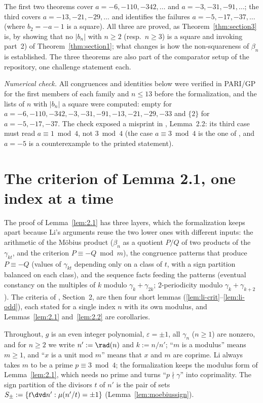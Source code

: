The first two theorems cover $a = -6, -110, -342, \dots$ and $a = -3, -31, -91, \dots$; the third
covers $a = -13, -21, -29, \dots$ and identifies the failures $a = -5, -17, -37, \dots$ (where
$b_2 = -a - 1$ is a square). All three are proved, as Theorem~\ref{thm:section3} is, by showing
that no $|b_n|$ with $n \ge 2$ (resp.\ $n \ge 3$) is a square and invoking part~2) of
Theorem~\ref{thm:section1}; what changes is how the non-squareness of $\beta_n$ is established.
The three theorems are also part of the comparator setup of the repository, one challenge
statement each.

\emph{Numerical check.} All congruences and identities below were verified in PARI/GP for the
first members of each family and $n \le 13$ before the formalization, and the lists of $n$ with
$|b_n|$ a square were computed: empty for $a = -6, -110, -342, -3, -31, -91, -13, -21, -29, -33$
and $\{2\}$ for $a = -5, -17, -37$. The check exposed a misprint in \cite{li2021}, Lemma~2.2: its
third case must read $a \equiv 1 \bmod 4$, not $3 \bmod 4$ (the case $a \equiv 3 \bmod 4$ is the
one of \cite{li2020}, and $a = -5$ is a counterexample to the printed statement).

\section{The criterion of Lemma 2.1, one index at a time}

The proof of Lemma~\ref{lem:2.1} has three layers, which the formalization keeps apart because
Li's arguments reuse the two lower ones with different inputs: the arithmetic of the Möbius
product ($\beta_n$ as a quotient $P/Q$ of two products of the $\gamma_{kt}$, and the criterion
$P \equiv -Q \bmod m$), the congruence patterns that produce $P \equiv -Q$ (values of
$\gamma_{kt}$ depending only on a class of $t$, with a sign partition balanced on each class),
and the sequence facts feeding the patterns (eventual constancy on the multiples of $k$ modulo
$\gamma_k + \gamma_{2k}$; $2$-periodicity modulo $\gamma_k + \gamma_{k+2}$). The criteria of
\cite{li2021}, Section~2, are then four short lemmas (\ref{lem:li-crit}--\ref{lem:li-odd}), each
stated for a single index $n$ with its own modulus, and Lemmas~\ref{lem:2.1} and~\ref{lem:2.2}
are corollaries.

Throughout, $g$ is an even integer polynomial, $\varepsilon = \pm 1$, all $\gamma_n$ ($n \ge 1$)
are nonzero, and for $n \ge 2$ we write $n' := \rad(n)$ and $k := n/n'$; ``$m$ is a modulus''
means $m \ge 1$, and ``$x$ is a unit mod $m$'' means that $x$ and $m$ are coprime. Li always
takes $m$ to be a prime $p \equiv 3 \bmod 4$; the formalization keeps the modulus form of
Lemma~\ref{lem:2.1}, which needs no prime and turns ``$p \nmid \gamma$'' into coprimality. The
sign partition of the divisors $t$ of $n'$ is the pair of sets
$S_\pm := \{t \dvd n' : \mu(n'/t) = \pm 1\}$ (Lemma~\ref{lem:moebiussign}).

